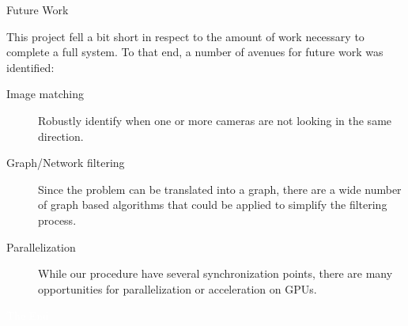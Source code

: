 \documentclass[aspectratio=43]{beamer}
\begin{document}
\begin{frame}{Future Work}

  This project fell a bit short in respect to the amount of work necessary to
  complete a full system. To that end, a number of avenues for future work was
  identified:

  \begin{description}
  \item[Image matching] Robustly identify when one or more cameras are
    not looking in the same direction.
  \item[Graph/Network filtering] Since the problem can be translated into a
    graph, there are a wide number of graph based algorithms that could be
    applied to simplify the filtering process.
  \item[Parallelization] While our procedure have several synchronization
    points, there are many opportunities for parallelization or acceleration on
    GPUs.
  \end{description}

\end{frame}

\bgroup
{}
\begin{frame}[t,plain]{}{}
  \begin{center}
    {\tiny \textcolor{white}{The End}}
  \end{center}
\end{frame}
\egroup
\end{document}
